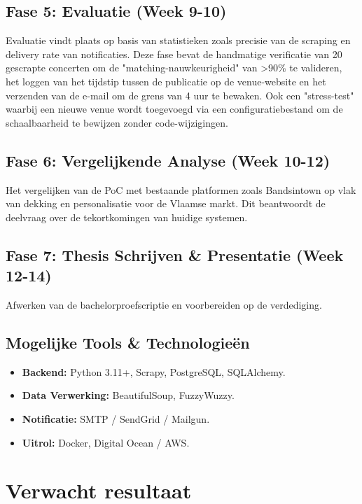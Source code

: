 \subsection{Fase 5: Evaluatie (Week 9-10)}
Evaluatie vindt plaats op basis van statistieken zoals precisie van de scraping en delivery rate van notificaties. Deze fase bevat de handmatige verificatie van 20 gescrapte concerten om de "matching-nauwkeurigheid" van >90\% te valideren, het loggen van het tijdstip tussen de publicatie op de venue-website en het verzenden van de e-mail om de grens van 4 uur te bewaken. Ook een "stress-test" waarbij een nieuwe venue wordt toegevoegd via een configuratiebestand om de schaalbaarheid te bewijzen zonder code-wijzigingen.

\subsection{Fase 6: Vergelijkende Analyse (Week 10-12)}
Het vergelijken van de PoC met bestaande platformen zoals Bandsintown op vlak van dekking en personalisatie voor de Vlaamse markt. Dit beantwoordt de deelvraag over de tekortkomingen van huidige systemen.

\subsection{Fase 7: Thesis Schrijven \& Presentatie (Week 12-14)}
Afwerken van de bachelorproefscriptie en voorbereiden op de verdediging.

\subsection{Mogelijke Tools \& Technologieën}
\begin{itemize}
    \item \textbf{Backend:} Python 3.11+, Scrapy, PostgreSQL, SQLAlchemy.
    \item \textbf{Data Verwerking:} BeautifulSoup, FuzzyWuzzy.
    \item \textbf{Notificatie:} SMTP / SendGrid / Mailgun.
    \item \textbf{Uitrol:} Docker, Digital Ocean / AWS.
\end{itemize}

\section{Verwacht resultaat}
\label{sec:verwachte_resultaten}

